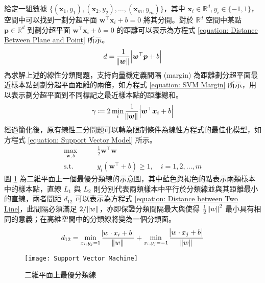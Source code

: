 給定一組數據 $\{ (\boldsymbol{x}_1, y_1), (\boldsymbol{x}_2, y_2), \ldots, (\boldsymbol{x}_{m}, y_m) \}$，其中 $\boldsymbol{x}_{i} \in \mathbb{R}^d, y_i \in \{-1, 1\}$，空間中可以找到一劃分超平面 $\boldsymbol{w}^{\top} \boldsymbol{x}_i + b = 0$ 將其分開。對於 $\mathbb{R}^d$ 空間中某點 $\boldsymbol{p} \in \mathbb{R}^d$ 到劃分超平面 $\boldsymbol{w}^{\top} \boldsymbol{x}_i + b = 0$ 的距離可以表示為方程式 \eqref{equation: Distance Between Plane and Point} 所示。
%
\begin{equation}\label{equation: Distance Between Plane and Point}
  d = \frac{1}{\norm{\boldsymbol{w}}} \abs{\boldsymbol{w}^{\top} \boldsymbol{p} + b}
\end{equation}
%
為求解上述的線性分類問題，支持向量機定義間隔 (margin) 為距離劃分超平面最近樣本點到劃分超平面距離的兩倍，如方程式 \eqref{equation: SVM Margin} 所示，用以表示劃分超平面到不同標記之最近樣本點的距離總和。
%
\begin{equation}\label{equation: SVM Margin}
  \gamma \coloneqq 2 \min_{i} \frac{1}{\norm{\boldsymbol{w}}} \abs{\boldsymbol{w}^{\top} \boldsymbol{x}_i + b}
\end{equation}
%
經過簡化後，原有線性二分問題可以轉為限制條件為線性方程式的最佳化模型，如方程式 \eqref{equation: Support Vector Model} 所示。
%
\begin{equation}\label{equation: Support Vector Model}
  \begin{aligned}
    \max_{\boldsymbol{w}, b} \qquad & \frac{1}{2} \boldsymbol{w}^{\top}\boldsymbol{w}                  \\
    \text{s.t.}              \qquad & y_i (\boldsymbol{w}^{\top} + b) \geq 1,\quad i = 1, 2, \ldots, m
  \end{aligned}
\end{equation}
%
圖 \ref{figure: Support Vector Machine} 為二維平面上一個最優分類線的示意圖，其中藍色與褐色的點表示兩類樣本中的樣本點，直線 $L_1$ 與 $L_2$ 則分別代表兩類樣本中平行於分類線並與其距離最小的直線，兩者間距 $d_{12}$ 可以表示為方程式 \eqref{equation: Distance between Two Line}，此間隔必須滿足 $2 / \norm{w}$，亦即保證分類間隔最大與使得 $\frac{1}{2} \norm{w}^2$ 最小具有相同的意義；在高維空間中的分類線將變為一個分類面。
%
\begin{equation}\label{equation: Distance between Two Line}
  d_{12} = \min_{x_i, y_j = 1} \frac{\abs{w\cdot x_i + b}}{\norm{w}} + \min_{x_i, y_j = -1} \frac{\abs{w\cdot x_j + b}}{\norm{w}}
\end{equation}
%
\begin{figure}[htbp]
  \centering
  \texttt{[image: Support Vector Machine]}
  \caption[二維平面上最優分類線]{二維平面上最優分類線}
  \label{figure: Support Vector Machine}
\end{figure}

